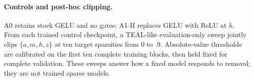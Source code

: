 \paragraph{Controls and post-hoc clipping.}
A0 retains stock GELU and no gates; A1-H replaces GELU with ReLU at $h$.  From
each trained control checkpoint, a TEAL-like evaluation-only sweep jointly
clips $\{a,m,h,z\}$ at ten target sparsities from 0 to .9.  Absolute-value
thresholds are calibrated on the first ten complete training blocks, then held
fixed for complete validation.  These sweeps answer how a fixed model responds
to removal; they are not trained sparse models.


